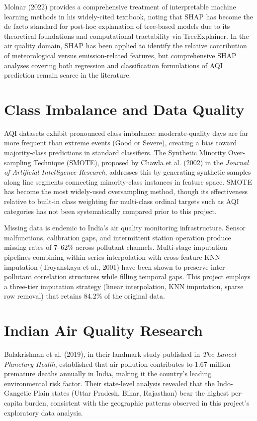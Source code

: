 \documentclass[12pt,a4paper]{report}
\begin{document}
Molnar (2022) provides a comprehensive treatment of interpretable machine learning methods in his widely-cited textbook, noting that SHAP has become the de facto standard for post-hoc explanation of tree-based models due to its theoretical foundations and computational tractability via TreeExplainer. In the air quality domain, SHAP has been applied to identify the relative contribution of meteorological versus emission-related features, but comprehensive SHAP analyses covering both regression and classification formulations of AQI prediction remain scarce in the literature.

\section{Class Imbalance and Data Quality}

AQI datasets exhibit pronounced class imbalance: moderate-quality days are far more frequent than extreme events (Good or Severe), creating a bias toward majority-class predictions in standard classifiers. The Synthetic Minority Over-sampling Technique (SMOTE), proposed by Chawla et al. (2002) in the \textit{Journal of Artificial Intelligence Research}, addresses this by generating synthetic samples along line segments connecting minority-class instances in feature space. SMOTE has become the most widely-used oversampling method, though its effectiveness relative to built-in class weighting for multi-class ordinal targets such as AQI categories has not been systematically compared prior to this project.

Missing data is endemic to India's air quality monitoring infrastructure. Sensor malfunctions, calibration gaps, and intermittent station operation produce missing rates of 7--62\% across pollutant channels. Multi-stage imputation pipelines combining within-series interpolation with cross-feature KNN imputation (Troyanskaya et al., 2001) have been shown to preserve inter-pollutant correlation structures while filling temporal gaps. This project employs a three-tier imputation strategy (linear interpolation, KNN imputation, sparse row removal) that retains 84.2\% of the original data.

\section{Indian Air Quality Research}

Balakrishnan et al. (2019), in their landmark study published in \textit{The Lancet Planetary Health}, established that air pollution contributes to 1.67 million premature deaths annually in India, making it the country's leading environmental risk factor. Their state-level analysis revealed that the Indo-Gangetic Plain states (Uttar Pradesh, Bihar, Rajasthan) bear the highest per-capita burden, consistent with the geographic patterns observed in this project's exploratory data analysis.
\end{document}
